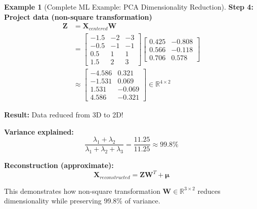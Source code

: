 \documentclass[12pt,a4paper]{article}
\theoremstyle{definition}
\newtheorem{example}{Example}[section]
\begin{document}
\begin{example}[Complete ML Example: PCA Dimensionality Reduction]
\textbf{Step 4: Project data (non-square transformation)}
\begin{align}
\mathbf{Z} &= \mathbf{X}_{centered}\mathbf{W} \\
&= \begin{bmatrix}
-1.5 & -2 & -3 \\
-0.5 & -1 & -1 \\
0.5 & 1 & 1 \\
1.5 & 2 & 3
\end{bmatrix} \begin{bmatrix}
0.425 & -0.808 \\
0.566 & -0.118 \\
0.706 & 0.578
\end{bmatrix} \\
&\approx \begin{bmatrix}
-4.586 & 0.321 \\
-1.531 & 0.069 \\
1.531 & -0.069 \\
4.586 & -0.321
\end{bmatrix} \in \mathbb{R}^{4 \times 2}
\end{align}

\textbf{Result:} Data reduced from 3D to 2D!

\textbf{Variance explained:}
\begin{equation}
\frac{\lambda_1 + \lambda_2}{\lambda_1 + \lambda_2 + \lambda_3} = \frac{11.25}{11.25} \approx 99.8\%
\end{equation}

\textbf{Reconstruction (approximate):}
\begin{equation}
\mathbf{X}_{reconstructed} = \mathbf{Z}\mathbf{W}^T + \boldsymbol{\mu}
\end{equation}

This demonstrates how non-square transformation $\mathbf{W} \in \mathbb{R}^{3 \times 2}$ reduces dimensionality while preserving 99.8\% of variance.
\end{example}
\end{document}
